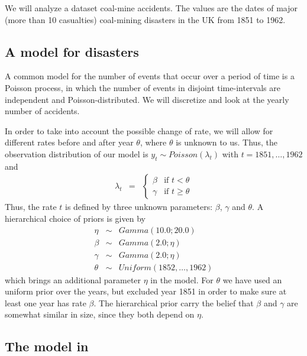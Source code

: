 We will analyze a dataset coal-mine accidents.
The values are the dates of major (more than 10 casualties) coal-mining disasters in the UK from 1851 to 1962. 


\subsection*{A model for disasters}

A common model for the number of events that occur over a period of time is a Poisson process, in which the number of events in disjoint time-intervals are independent and Poisson-distributed. 
We will discretize and look at the yearly number of accidents. 

In order to take into account the possible change of rate, we will allow for different rates before and after year $\theta$, where $\theta$ is unknown to us. 
Thus, the observation distribution of our model is 
$y_t \sim Poisson(\lambda_t)$ with $t = 1851,\ldots,1962$ and
\begin{eqnarray*}
\lambda_t & = & \begin{cases}
\beta & \mbox{if } t < \theta \\
\gamma & \mbox{if } t \geq \theta
\end{cases}
\end{eqnarray*}
Thus, the rate $t$ is defined by three unknown parameters: $\beta$, $\gamma$ and $\theta$. A hierarchical choice of priors is given by
\begin{eqnarray*}
 \eta & \sim & Gamma(10.0;20.0) \\ 
 \beta & \sim & Gamma(2.0;\eta) \\
 \gamma & \sim &Gamma(2.0;\eta) \\
 \theta & \sim & Uniform(1852,\ldots,1962)
\end{eqnarray*}
which brings an additional parameter $\eta$ in the model. 
For $\theta$ we have used an uniform prior over the years, but excluded year 1851 in order to make sure at least one year has rate $\beta$. 
The hierarchical prior carry the belief that $\beta$ and $\gamma$ are somewhat similar in size,
since they both depend on $\eta$. 

\subsection*{The model in \Rev}

